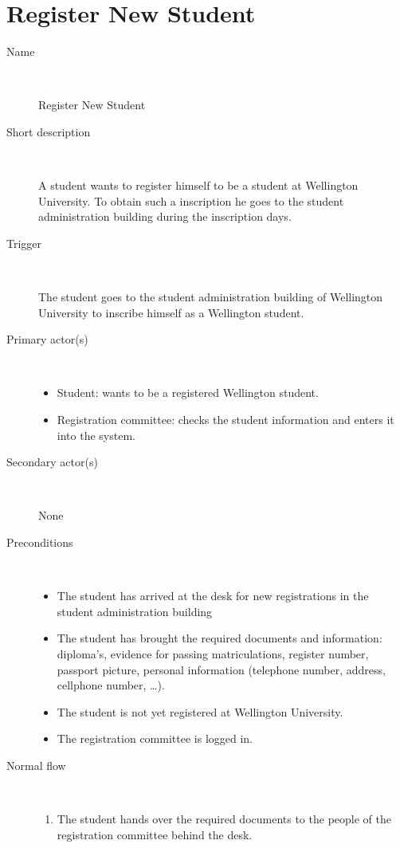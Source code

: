 \section{Register New Student}

\begin{description}
	\item[Name] \
		\par Register New Student
	\item[Short description] \ 
			\par A student wants to register himself to be a student at Wellington
			University. To obtain such a inscription he goes to the student
			administration building during the inscription days.
	\item[Trigger] \ 
			\par The student goes to the student administration building of Wellington
			University to inscribe himself as a Wellington student.
	\item[Primary actor(s)] \ 
		\begin{itemize}
		  \item Student: wants to be a registered Wellington student.
		  \item Registration committee: checks the student information and enters it
		  into the system.
		\end{itemize}
	\item[Secondary actor(s)] \ 
		\par None
	\item[Preconditions] \ 
	\begin{itemize}
		\item The student has arrived at the desk for new registrations in the student administration building
		\item The student has brought the required documents and information:
		diploma's, evidence for passing matriculations, register number, passport
		picture, personal information (telephone number, address, cellphone number,
		\ldots).
		\item The student is not yet registered at Wellington University.
		\item The registration committee is logged in.
	\end{itemize}
	\item[Normal flow] \ 
	\begin{enumerate}
	  	\item The student hands over the required documents to the people of the
	  	registration committee behind the desk.

\end{enumerate}
\end{description}
